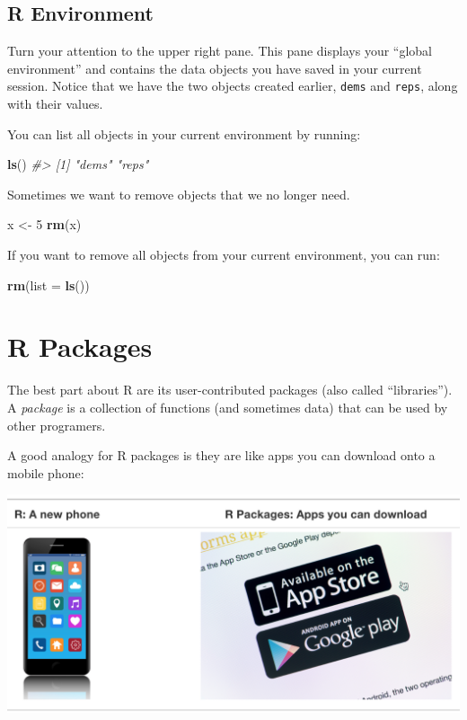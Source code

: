 \documentclass[]{book}
\newenvironment{Shaded}{\begin{snugshade}}{\end{snugshade}}
\newcommand{\KeywordTok}[1]{\textcolor[rgb]{0.13,0.29,0.53}{\textbf{#1}}}
\newcommand{\DataTypeTok}[1]{\textcolor[rgb]{0.13,0.29,0.53}{#1}}
\newcommand{\DecValTok}[1]{\textcolor[rgb]{0.00,0.00,0.81}{#1}}
\newcommand{\StringTok}[1]{\textcolor[rgb]{0.31,0.60,0.02}{#1}}
\newcommand{\CommentTok}[1]{\textcolor[rgb]{0.56,0.35,0.01}{\textit{#1}}}
\newcommand{\NormalTok}[1]{#1}
\begin{document}
\subsection{R Environment}\label{r-environment}

Turn your attention to the upper right pane. This pane displays your
``global environment'' and contains the data objects you have saved in
your current session. Notice that we have the two objects created
earlier, \texttt{dems} and \texttt{reps}, along with their values.

You can list all objects in your current environment by running:

\begin{Shaded}
\begin{Highlighting}[]
\KeywordTok{ls}\NormalTok{()}
\CommentTok{#> [1] "dems" "reps"}
\end{Highlighting}
\end{Shaded}

Sometimes we want to remove objects that we no longer need.

\begin{Shaded}
\begin{Highlighting}[]
\NormalTok{x <-}\StringTok{ }\DecValTok{5}
\KeywordTok{rm}\NormalTok{(x)}
\end{Highlighting}
\end{Shaded}

If you want to remove all objects from your current environment, you can
run:

\begin{Shaded}
\begin{Highlighting}[]
\KeywordTok{rm}\NormalTok{(}\DataTypeTok{list =} \KeywordTok{ls}\NormalTok{())}
\end{Highlighting}
\end{Shaded}

\hypertarget{r-packages-1}{\section{R Packages}\label{r-packages-1}}

The best part about R are its user-contributed packages (also called
``libraries''). A \emph{package} is a collection of functions (and
sometimes data) that can be used by other programers.

A good analogy for R packages is they are like apps you can download
onto a mobile phone:

\begin{center}\includegraphics[width=0.7\linewidth]{img/R_vs_R_packages} \end{center}
\end{document}
